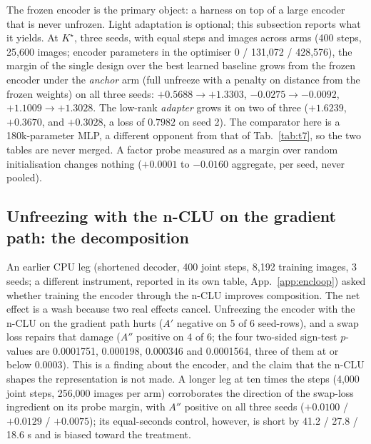 \documentclass{article} %
\newcommand{\Kstar}{\ensuremath{K^{\star}}}
\begin{document}
The frozen encoder is the primary object: a harness on top of a large encoder that is never
unfrozen. Light adaptation is optional; this subsection reports what it yields. At $\Kstar$, three
seeds, with equal steps and images across arms (400 steps, 25,600 images; encoder parameters in the
optimiser 0 / 131,072 / 428,576), the margin of the single design over the best learned
baseline grows from the frozen encoder under the \emph{anchor} arm (full unfreeze with a
penalty on distance from the frozen weights) on all three seeds: $+0.5688\to+1.3303$,
$-0.0275\to-0.0092$, $+1.1009\to+1.3028$. The low-rank \emph{adapter} grows it on two of
three ($+1.6239$, $+0.3670$, and $+0.3028$, a loss of $0.7982$ on seed 2).
The comparator here is a 180k-parameter MLP, a different opponent from that of
Tab.~\ref{tab:t7}, so the two tables are never merged. A factor probe measured as a margin over
random initialisation changes nothing ($+0.0001$ to $-0.0160$ aggregate, per seed, never pooled).

\subsection*{Unfreezing with the n-CLU on the gradient path: the decomposition}

An earlier CPU leg (shortened decoder, 400 joint steps, 8,192 training images, 3 seeds; a
different instrument, reported in its own table, App.~\ref{app:encloop}) asked whether
training the encoder through the n-CLU improves composition. The net effect is a wash because two
real effects cancel. Unfreezing the encoder with the n-CLU on the gradient path hurts ($A'$
negative on 5 of 6 seed-rows), and a swap loss repairs that damage ($A''$ positive on 4 of 6;
the four two-sided sign-test $p$-values are 0.0001751, 0.000198, 0.000346 and 0.0001564, three
of them at or below 0.0003). This is a finding about the encoder, and the claim
that the n-CLU shapes the representation is not made. %
A longer leg at ten times the steps (4,000 joint steps, 256,000 images per arm) corroborates
the direction of the swap-loss ingredient on its probe margin, with $A''$ positive on all three
seeds ($+0.0100$ / $+0.0129$ / $+0.0075$); its equal-seconds control, however, is short by 41.2 /
27.8 / 18.6 s and is biased toward the treatment. %
\end{document}
